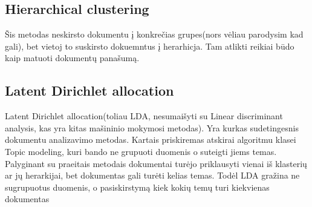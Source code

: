 \documentclass{VUMIFInfKursinis}
\begin{document}
\subsection{Hierarchical clustering}
Šis metodas neskirsto dokumentu į konkrečias grupes(nors vėliau parodysim kad gali), bet vietoj to suskirsto dokuemntus į herarhicja. Tam atlikti reikiai būdo kaip matuoti dokumentų panašumą. 
\subsection{Latent Dirichlet allocation}
	Latent Dirichlet allocation(toliau LDA, nesumaišyti su Linear discriminant analysis, kas yra kitas mašininio mokymosi metodas). Yra kurkas sudetingesnis dokumentu analizavimo metodas. Kartais priskiremas atskirai algoritmu klasei Topic modeling, kuri bando ne grupuoti duomenis o suteigti jiems temas. Palyginant su praeitais metodais dokumentai turėjo priklausyti vienai iš klasterių ar jų herarkijai, bet dokumentas gali turėti kelias temas. 
Todėl LDA gražina ne sugrupuotus duomenis, o pasiskirstymą kiek kokių temų turi kiekvienas dokumentas  
\end{document}
